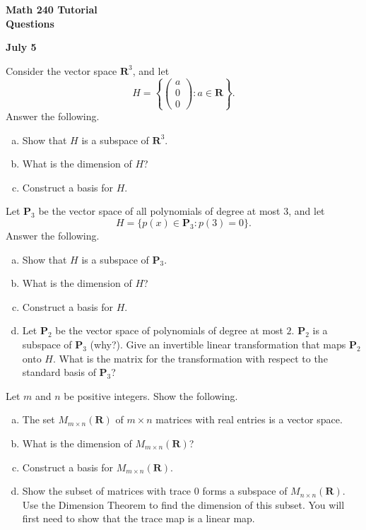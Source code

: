 \documentclass[a4paper,11pt]{article}
\newcommand{\R}{\mathbf{R}}
\newcommand{\PP}{\mathbf{P}}
\begin{document}
\begin{center}
  {\Large\bfseries Math 240 Tutorial \\ Questions}
\end{center}
\begin{center}
  {\bfseries July 5}
\end{center}

 Consider the vector space $\R^3$, and let
\[
  H=\left\{
    \begin{pmatrix}a\\0\\0\end{pmatrix}
    : a \in \R
  \right\}.
\]
Answer the following.
\begin{enumerate}[(a)]
\item Show that $H$ is a subspace of $\R^3$.
\item What is the dimension of $H$?
\item Construct a basis for $H$. \\
\end{enumerate}

 Let $\PP_3$ be the vector space of all polynomials
of degree at most 3, and let
\[
  H = \{p(x) \in \PP_3 : p(3)=0\}.
\]
Answer the following.
\begin{enumerate}[(a)]
\item Show that $H$ is a subspace of $\PP_3$.
\item What is the dimension of $H$?
\item Construct a basis for $H$.
\item Let $\PP_2$ be the vector space of polynomials of degree at most $2$.
  $\PP_2$ is a subspace of $\PP_3$ (why?). Give an invertible linear
  transformation that maps $\PP_2$ onto $H$. What is the matrix for the
  transformation with respect to the standard basis of $\PP_3$? \\
\end{enumerate}

 Let $m$ and $n$ be positive integers. Show the
following.
\begin{enumerate}[(a)]
\item The set $M_{m \times n}(\R)$ of $m \times n$ matrices with real entries is
  a vector space.
\item What is the dimension of $M_{m \times n}(\R)$?
\item Construct a basis for $M_{m \times n}(\R)$.
\item Show the subset of matrices with trace 0 forms a subspace of $M_{n \times
    n}(\R)$. Use the Dimension Theorem to find the dimension of this subset. You
  will first need to show that the trace map is a linear map. \\
\end{enumerate}
\end{document}
